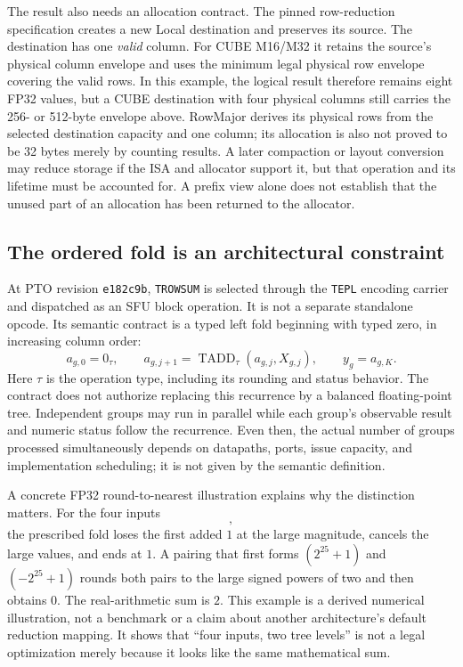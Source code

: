 The result also needs an allocation contract. The pinned row-reduction specification creates a new Local destination and preserves its source. The destination has one \emph{valid} column. For CUBE M16/M32 it retains the source's physical column envelope and uses the minimum legal physical row envelope covering the valid rows. In this example, the logical result therefore remains eight FP32 values, but a CUBE destination with four physical columns still carries the 256- or 512-byte envelope above. RowMajor derives its physical rows from the selected destination capacity and one column; its allocation is also not proved to be 32 bytes merely by counting results. A later compaction or layout conversion may reduce storage if the ISA and allocator support it, but that operation and its lifetime must be accounted for. A prefix view alone does not establish that the unused part of an allocation has been returned to the allocator.~\citep{u005-pto-trowsum,u005-pto-reduction-legality}

\subsection{The ordered fold is an architectural constraint}

At PTO revision \texttt{e182c9b}, \texttt{TROWSUM} is selected through the \texttt{TEPL} encoding carrier and dispatched as an SFU block operation. It is not a separate standalone opcode. Its semantic contract is a typed left fold beginning with typed zero, in increasing column order:
\begin{equation}
 a_{g,0}=0_{\tau},\qquad
 a_{g,j+1}=\operatorname{TADD}_{\tau}(a_{g,j},X_{g,j}),\qquad
 y_g=a_{g,K}.
 \label{eq:u005-fold}
\end{equation}
Here $\tau$ is the operation type, including its rounding and status behavior. The contract does not authorize replacing this recurrence by a balanced floating-point tree. Independent groups may run in parallel while each group's observable result and numeric status follow the recurrence. Even then, the actual number of groups processed simultaneously depends on datapaths, ports, issue capacity, and implementation scheduling; it is not given by the semantic definition.~\citep{u005-pto-trowsum}

A concrete FP32 round-to-nearest illustration explains why the distinction matters. For the four inputs
\begin{equation}
 [2^{25},\ 1,\ -2^{25},\ 1],
\end{equation}
the prescribed fold loses the first added $1$ at the large magnitude, cancels the large values, and ends at $1$. A pairing that first forms $(2^{25}+1)$ and $(-2^{25}+1)$ rounds both pairs to the large signed powers of two and then obtains $0$. The real-arithmetic sum is $2$. This example is a derived numerical illustration, not a benchmark or a claim about another architecture's default reduction mapping. It shows that ``four inputs, two tree levels'' is not a legal optimization merely because it looks like the same mathematical sum.

